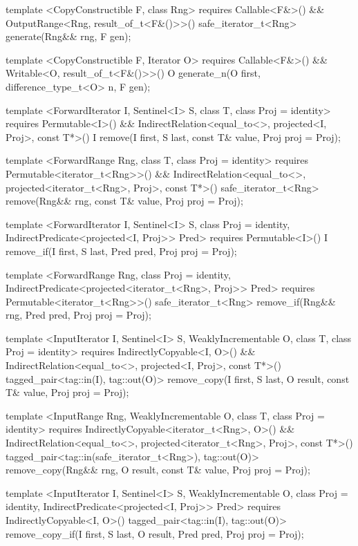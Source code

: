\begin{codeblock}
{{{{  template <CopyConstructible F, class Rng>
      requires Callable<F&>() && OutputRange<Rng, result_of_t<F&()>>()
    safe_iterator_t<Rng>
      generate(Rng&& rng, F gen);

  template <CopyConstructible F, Iterator O>
      requires Callable<F&>() && Writable<O, result_of_t<F&()>>()
    O generate_n(O first, difference_type_t<O> n, F gen);

  template <ForwardIterator I, Sentinel<I> S, class T, class Proj = identity>
    requires Permutable<I>() &&
      IndirectRelation<equal_to<>, projected<I, Proj>, const T*>()
    I remove(I first, S last, const T& value, Proj proj = Proj{});

  template <ForwardRange Rng, class T, class Proj = identity>
    requires Permutable<iterator_t<Rng>>() &&
      IndirectRelation<equal_to<>, projected<iterator_t<Rng>, Proj>, const T*>()
    safe_iterator_t<Rng>
      remove(Rng&& rng, const T& value, Proj proj = Proj{});

  template <ForwardIterator I, Sentinel<I> S, class Proj = identity,
      IndirectPredicate<projected<I, Proj>> Pred>
    requires Permutable<I>()
    I remove_if(I first, S last, Pred pred, Proj proj = Proj{});

  template <ForwardRange Rng, class Proj = identity,
      IndirectPredicate<projected<iterator_t<Rng>, Proj>> Pred>
    requires Permutable<iterator_t<Rng>>()
    safe_iterator_t<Rng>
      remove_if(Rng&& rng, Pred pred, Proj proj = Proj{});

  template <InputIterator I, Sentinel<I> S, WeaklyIncrementable O, class T,
      class Proj = identity>
    requires IndirectlyCopyable<I, O>() &&
      IndirectRelation<equal_to<>, projected<I, Proj>, const T*>()
    tagged_pair<tag::in(I), tag::out(O)>
      remove_copy(I first, S last, O result, const T& value, Proj proj = Proj{});

  template <InputRange Rng, WeaklyIncrementable O, class T, class Proj = identity>
    requires IndirectlyCopyable<iterator_t<Rng>, O>() &&
      IndirectRelation<equal_to<>, projected<iterator_t<Rng>, Proj>, const T*>()
    tagged_pair<tag::in(safe_iterator_t<Rng>), tag::out(O)>
      remove_copy(Rng&& rng, O result, const T& value, Proj proj = Proj{});

  template <InputIterator I, Sentinel<I> S, WeaklyIncrementable O,
      class Proj = identity, IndirectPredicate<projected<I, Proj>> Pred>
    requires IndirectlyCopyable<I, O>()
    tagged_pair<tag::in(I), tag::out(O)>
      remove_copy_if(I first, S last, O result, Pred pred, Proj proj = Proj{});

}}}}
\end{codeblock}
